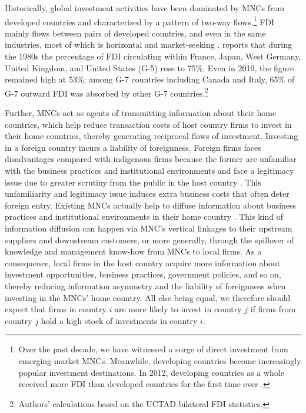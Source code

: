 \documentclass[reqno,onecolumn,letterpaper,12pt]{article}
\begin{document}
Historically, global investment activities have been dominated by MNCs from developed countries and characterized by a pattern of two-way flows.\footnote{Over the past decade, we have witnessed a surge of direct investment from emerging-market MNCs. Meanwhile, developing countries become increasingly popular investment destinations. In 2012, developing countries as a whole received more FDI than developed countries for the first time ever \citep{UNCTAD:2013}.} FDI mainly flows between pairs of developed countries, and even in the same industries, most of which is horizontal and market-seeking \citep[171]{Markusen:1995}. \citet[~22]{Julius:1990} reports that during the 1980s the percentage of FDI circulating within France, Japan, West Germany, United Kingdom, and United States (G-5) rose to 75\%. Even in 2010, the figure remained high at 53\%; among G-7 countries including Canada and Italy, 65\% of G-7 outward FDI was absorbed by other G-7 countries.\footnote{Authors' calculations based on the UCTAD bilateral FDI statistics.}

Further, MNCs act as agents of transmitting information about their home countries, which help reduce transaction costs of host country firms to invest in their home countries, thereby generating reciprocal flows of investment. Investing in a foreign country incurs a liability of foreignness. Foreign firms faces disadvantages compared with indigenous firms because the former are unfamiliar with the business practices and institutional environments and face a legitimacy issue due to greater scrutiny from the public in the host country \citep{Zaheer:1995,Kostova_Zaheer:1999,Hymer:1976}. This unfamiliarity and legitimacy issue induces extra business costs that often deter foreign entry. Existing MNCs actually help to diffuse information about business practices and institutional environments in their home country \citep{Kwok_Tadesse:2006,Sandholtz_Gray:2003}. This kind of information diffusion can happen via MNC's vertical linkages to their upstream suppliers and downstream customers, or more generally, through the spillover of knowledge and management know-how from MNCs to local firms. As a consequence, local firms in the host country acquire more information about investment opportunities, business practices, government policies, and so on, thereby reducing information asymmetry and the liability of foreignness when investing in the MNCs' home country. All else being equal, we therefore should expect that firms in country $i$ are more likely to invest in country $j$ if firms from country $j$ hold a high stock of investments in country $i$.
\end{document}
